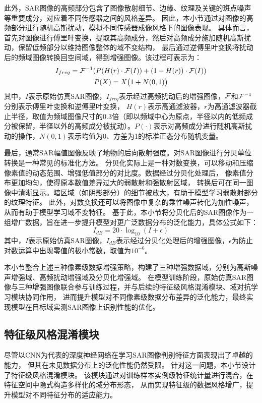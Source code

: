 此外，SAR图像的高频部分包含了图像散射细节、边缘、纹理及关键的斑点噪声等重要成分，对应着不同传感器之间的风格差异。
因此，本小节通过对图像的高频部分进行随机高斯扰动，模拟不同传感器成像风格下的图像表现。
具体而言，首先对图像进行傅里叶变换，提取其高频成分，然后对高频成分施加随机高斯扰动，保留低频部分以维持图像整体的域不变结构，
最后通过逆傅里叶变换将扰动后的频域图像转换回空间域，得到增强图像。该过程可表示为：
\begin{gather}
  {I_{freq}} = {{\cal F}^{ - 1}}(P(H(r) \cdot {\cal F}(I)) + (1 - H(r)) \cdot {\cal F}(I)) \\
  P(X) = X\bigl(1 + N(0,1)\bigr)   
\end{gather}
其中，$I$表示原始仿真SAR图像，$I_{freq}$表示经过高频扰动后的增强图像，${\cal F}$和${\cal F}^{-1}$分别表示傅里叶变换和逆傅里叶变换，
$H(r)$表示高通滤波器，$r$为高通滤波器截止半径，取值为频域图像尺寸的0.3倍（即以频域中心为原点，半径以内的低频成分被保留，半径以外的高频成分被扰动）。$P(\cdot)$表示对高频成分进行随机高斯扰动的操作，$N(0,1)$表示均值为0、方差为1的标准正态分布随机变量。

最后，通常SAR幅值图像反映了地物的后向散射强度。对SAR图像进行分贝单位转换是一种常见的标准化方法。
分贝化实际上是一种对数变换，可以移动和压缩像素值的动态范围、增强低值部分的对比度。数据经过分贝化处理后，
像素值分布更加均匀，使得原本数值差异过大的弱散射和强散射区域，
转换后可在同一图像中清晰显示。暗区域（如阴影部分）的细节被放大，有助于模型学习弱散射部分的纹理特征。
此外，对数变换还可以将图像中复杂的乘性噪声转化为加性噪声，从而有助于模型学习域不变特征。
基于此，本小节将分贝化后的SAR图像作为一组增广数据，旨在进一步提升模型对更广泛数据分布的泛化能力，具体公式如下：
\begin{equation}
I_{dB} = 20 \cdot \log_{10}(I + \epsilon)
\end{equation}
其中，$I$表示原始仿真SAR图像，$I_{dB}$表示经过分贝化处理后的增强图像，$\epsilon$为防止对数运算中出现零值的极小常数，取值为$10^{-6}$。

本小节整合上述三种像素级数据增强策略，构建了三种增强数据域，分别为高斯噪声增强域、高频扰动增强域及分贝化增强域。
在模型训练阶段，原始仿真SAR图像与三种增强图像联合参与训练过程，并与后续的特征级风格混淆模块、域对抗学习模块协同作用，
进而提升模型对不同像素级数据分布差异的泛化能力，最终实现模型在目标域实测SAR图像上识别性能的优化。


\subsection{特征级风格混淆模块}
尽管以CNN为代表的深度神经网络在学习SAR图像判别特征方面表现出了卓越的能力，
但其在未见数据分布上的泛化性能仍然受限。
针对这一问题，本小节设计了特征级风格混淆模块。
该模块通过对训练样本实例级特征统计量进行混合，在特征空间中隐式构造多样化的域分布形态，
从而实现特征级的数据风格增广，提升模型对不同特征分布的适应能力。

